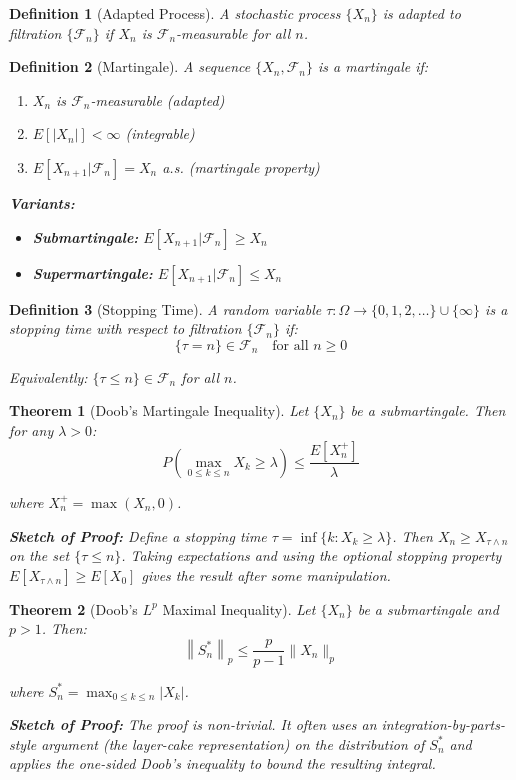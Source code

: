 \documentclass[12pt,a4paper]{article}
\newtheorem{theorem}{Theorem}[section]
\newtheorem{definition}{Definition}[section]
\theoremstyle{remark}
\begin{document}
\begin{definition}[Adapted Process]
A stochastic process $\{X_n\}$ is adapted to filtration $\{\mathcal{F}_n\}$ if $X_n$ is $\mathcal{F}_n$-measurable for all $n$.
\end{definition}

\begin{definition}[Martingale]
A sequence $\{X_n, \mathcal{F}_n\}$ is a martingale if:
\begin{enumerate}
\item $X_n$ is $\mathcal{F}_n$-measurable (adapted)
\item $E[|X_n|] < \infty$ (integrable)
\item $E[X_{n+1}|\mathcal{F}_n] = X_n$ a.s. (martingale property)
\end{enumerate}

\textbf{Variants:}
\begin{itemize}
\item \textbf{Submartingale:} $E[X_{n+1}|\mathcal{F}_n] \geq X_n$
\item \textbf{Supermartingale:} $E[X_{n+1}|\mathcal{F}_n] \leq X_n$
\end{itemize}
\end{definition}

\begin{definition}[Stopping Time]
A random variable $\tau: \Omega \to \{0, 1, 2, \ldots\} \cup \{\infty\}$ is a stopping time with respect to filtration $\{\mathcal{F}_n\}$ if:
$$\{\tau = n\} \in \mathcal{F}_n \quad \text{for all } n \geq 0$$

Equivalently: $\{\tau \leq n\} \in \mathcal{F}_n$ for all $n$.
\end{definition}

\begin{theorem}[Doob's Martingale Inequality]
Let $\{X_n\}$ be a submartingale. Then for any $\lambda > 0$:
$$P\left(\max_{0 \leq k \leq n} X_k \geq \lambda\right) \leq \frac{E[X_n^+]}{\lambda}$$

where $X_n^+ = \max(X_n, 0)$.

\textbf{Sketch of Proof:} Define a stopping time $\tau = \inf\{k: X_k \geq \lambda\}$. Then $X_n \geq X_{\tau \wedge n}$ on the set $\{\tau \leq n\}$. Taking expectations and using the optional stopping property $E[X_{\tau \wedge n}] \geq E[X_0]$ gives the result after some manipulation.
\end{theorem}

\begin{theorem}[Doob's $L^p$ Maximal Inequality]
Let $\{X_n\}$ be a submartingale and $p > 1$. Then:
$$\left\|S_n^*\right\|_p \leq \frac{p}{p-1} \|X_n\|_p$$

where $S_n^* = \max_{0 \leq k \leq n} |X_k|$.

\textbf{Sketch of Proof:} The proof is non-trivial. It often uses an integration-by-parts-style argument (the layer-cake representation) on the distribution of $S_n^*$ and applies the one-sided Doob's inequality to bound the resulting integral.
\end{theorem}
\end{document}
